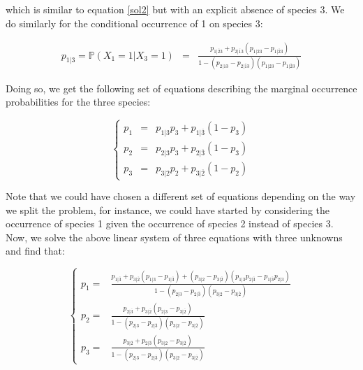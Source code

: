which is similar to equation \eqref{sol2} but with an explicit absence of species 3. We do similarly for the conditional occurrence of 1 on species 3:

  \begin{eqnarray}
     \label{sols2b}
     p_{1|3}=\mathbb{P}(X_{1}=1| X_{3}=1)&=& \frac{p_{1|\overline{2}3}+ p_{2|\overline{1}3} (p_{1|23}- p_{1|\overline{2}3})}{1- (p_{2|13}-p_{2|\overline{1}3})( p_{1|23} - p_{1|\overline{2}3})}
  \end{eqnarray}

Doing so, we get the following set of equations describing the marginal occurrence probabilities for the three species:

  \begin{equation} \left\{ \begin{aligned} \label{s3nind}
    p_1 &=&  p_{1|3}p_3 + p_{1|\overline{3}}(1-p_3)  \\
    p_2 &=& p_{2|3}p_3 + p_{2|\overline{3}}(1-p_3)  \\
    p_3 &=&  p_{3|2}p_2 + p_{3|\overline{2}}(1-p_2)
  \end{aligned} \right. \end{equation}

Note that we could have chosen a different set of equations depending on the way we split the problem, for instance, we could have started by considering the occurrence of species 1 given the occurrence of species 2 instead of species 3. Now, we solve the above linear system of three equations with three unknowns and find that:

\begin{equation} \left\{ \begin{aligned} \label{sol3}
    p_1 =& \frac{p_{1|\overline{3}}+p_{3|\overline{2}}(p_{1|3}-p_{1|\overline{3}})+(p_{3|2}-p_{3|\overline{2}})(p_{1|3}p_{2|\overline{3}} -p_{1|\overline{3}}p_{2|3})}  {1-(p_{2|3}-p_{2|\overline{3}})(p_{3|2}-p_{3|\overline{2}})}\\
    p_2 =& \frac{p_{2|\overline{3}}+p_{3|\overline{2}}(p_{2|3}-p_{3|\overline{2}})}{1-(p_{2|3}-p_{2|\overline{3}})(p_{3|2}-p_{3|\overline{2}})} \\
    p_3 =& \frac{p_{3|\overline{2}}+p_{2|\overline{3}}(p_{3|2}-p_{3|\overline{2}})}{1-(p_{2|3}-p_{2|\overline{3}})(p_{3|2}-p_{3|\overline{2}})}
  \end{aligned} \right. \end{equation}

